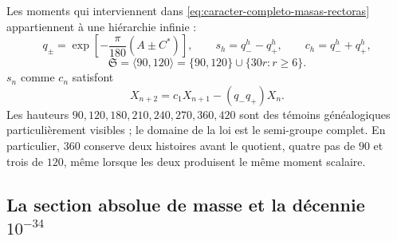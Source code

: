 Les moments qui interviennent dans
\eqref{eq:caracter-completo-masas-rectoras} appartiennent à une hiérarchie infinie :
\begin{equation}
 q_\pm=\exp\!\left[-\frac{\pi}{180}(A\pm C^*)\right],
 \qquad s_h=q_-^h-q_+^h,\qquad c_h=q_-^h+q_+^h,
 \label{eq:momentos-torres-masas-rectoras}
\end{equation}
\begin{equation}
 \mathfrak S=\langle90,120\rangle
 =\{90,120\}\cup\{30r:r\ge6\}.
 \label{eq:semigrupo-global-torres-masas-rectoras}
\end{equation}
\(s_n\) comme \(c_n\) satisfont
\begin{equation}
 X_{n+2}=c_1X_{n+1}-(q_-q_+)X_n.
 \label{eq:recurrencia-torres-masas-rectoras}
\end{equation}
Les hauteurs \(90,120,180,210,240,270,360,420\) sont des témoins généalogiques
particulièrement visibles ; le domaine de la loi est le semi-groupe complet. En
particulier, \(360\) conserve deux histoires avant le quotient, quatre pas de
\(90\) et trois de \(120\), même lorsque les deux produisent le même moment scalaire.

\subsection{La section absolue de masse et la décennie \texorpdfstring{\(10^{-34}\)}{10⁻³⁴}}

